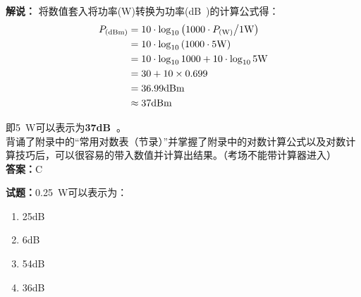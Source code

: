 \documentclass{ctexbook}
\begin{document}
\noindent\textbf{解说：}
将数值套入将功率(\unit{\watt})转换为功率(\unit[qualifier-mode=combine]{\deci\bel{}})的计算公式得：
\begin{equation*}
  \begin{aligned}
    P_{(\unit[qualifier-mode=combine]{\deci\bel\of{m}})} & = 10 \cdot \log_{10} \left( 1000 \cdot P_{(\unit{\watt})} \middle/ 1 \unit{\watt} \right) \\
                                                         & = 10 \cdot \log_{10} \left( 1000 \cdot 5 \unit{\watt} \right)                             \\
                                                         & = 10 \cdot \log_{10} 1000 + 10 \cdot \log_{10} 5 \unit{\watt}                             \\
                                                         & = 30 + 10 \times 0.699                                                                    \\
                                                         & = 36.99 \unit[qualifier-mode=combine]{\deci\bel\of{m}}                                    \\
                                                         & \approx 37     \unit[qualifier-mode=combine]{\deci\bel\of{m}}
  \end{aligned}
\end{equation*}

即\qty{5}{\watt}可以表示为\textbf{\num{37}\unit[qualifier-mode=combine]{\deci\bel{}}}。
\\背诵了附录中的“常用对数表（节录）”并掌握了附录中的对数计算公式以及对数计算技巧后，可以很容易的带入数值并计算出结果。（考场不能带计算器进入）\\\noindent\textbf{答案：}C

\vspace{\baselineskip}

\noindent\textbf{试题：}\qty{0.25}{\watt}可以表示为：

\begin{enumerate}[leftmargin=3em]
  \item \num{25}\unit[qualifier-mode=combine]{\deci\bel{}}
  \item \num{6}\unit[qualifier-mode=combine]{\deci\bel{}}
  \item \num{54}\unit[qualifier-mode=combine]{\deci\bel{}}
  \item \num{36}\unit[qualifier-mode=combine]{\deci\bel{}}
\end{enumerate}
\end{document}
